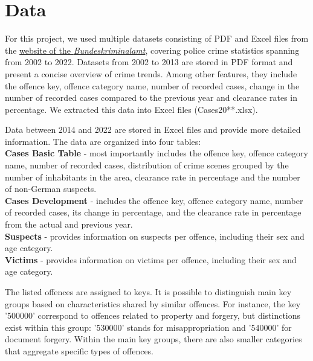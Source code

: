 \documentclass{article}
\theoremstyle{plain}
\theoremstyle{definition}
\theoremstyle{remark}
\begin{document}
\section{Data}\label{sec:data}

For this project, we used multiple datasets consisting of PDF and Excel files from the \href{https://www.bka.de/EN/CurrentInformation/Statistics/PoliceCrimeStatistics/policecrimestatistics_node.html}{website of the \textit{Bundeskriminalamt}}, covering police crime statistics spanning from 2002 to 2022. Datasets from 2002 to 2013 are stored in PDF format and present a concise overview of crime trends. Among other features, they include the offence key, offence category name, number of recorded cases, change in the number of recorded cases compared to the previous year and clearance rates in percentage. We extracted this data into Excel files (Cases20**.xlsx).

Data between 2014 and 2022 are stored in Excel files and provide more detailed information. The data are organized into four tables: \\
\textbf{Cases Basic Table} - most importantly includes the offence key, offence category name, number of recorded cases, distribution of crime scenes grouped by the number of inhabitants in the area, clearance rate in percentage and the number of non-German suspects. \\
\textbf{Cases Development} - includes the offence key, offence category name, number of recorded cases, its change in percentage, and the clearance rate in percentage from the actual and previous year. \\
\textbf{Suspects} - provides information on suspects per offence, including their sex and age category.\\  
\textbf{Victims} - provides information on victims per offence, including their sex and age category.


The listed offences are assigned to keys. It is possible to distinguish main key groups based on characteristics shared by similar offences. For instance, the key '500000' correspond to offences related to property and forgery, but distinctions exist within this group: '530000' stands for misappropriation  and '540000' for document forgery. Within the main key groups, there are also smaller categories that aggregate specific types of offences.
\end{document}
